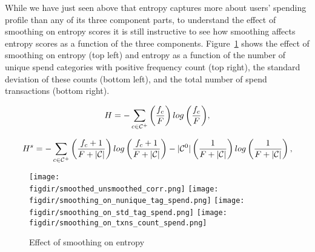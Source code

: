 While we have just seen above that entropy captures more about users' spending
profile than any of its three component parts, to understand the effect of
smoothing on entropy scores it is still instructive to see how smoothing
affects entropy scores as a function of the three components.
Figure~\ref{fig:effect_of_smoothing} shows the effect of smoothing on entropy
(top left) and entropy as a function of the number of unique spend categories
with positive frequency count (top right), the standard deviation of these
counts (bottom left), and the total number of spend transactions (bottom
right).




\newpage

\begin{equation}
\label{equ:entropy_us}
H = -\sum_{c \in \mathcal{C}^{+}}{\left(\frac{f_c}{F}\right)
log\left(\frac{f_c}{F}\right)},
\end{equation}

\begin{equation}
\label{equ:entropy_s}
H^s = -\sum_{c \in \mathcal{C}^{+}}{\left(\frac{f_c + 1}{F + |\mathcal{C}|}\right)
log\left(\frac{f_c + 1}{F + |\mathcal{C}|}\right)}
- |\mathcal{C}^{0}|\left(\frac{1}{F + |\mathcal{C}|}\right)
log\left(\frac{1}{F + |\mathcal{C}|}\right),
\end{equation}



\begin{figure}[h]
    \centering 
    \caption{Effect of smoothing on entropy}
    \label{fig:effect_of_smoothing}
    \texttt{[image: \\figdir/smoothed\_unsmoothed\_corr.png]}
    \texttt{[image: \\figdir/smoothing\_on\_nunique\_tag\_spend.png]}
    \texttt{[image: \\figdir/smoothing\_on\_std\_tag\_spend.png]}
    \texttt{[image: \\figdir/smoothing\_on\_txns\_count\_spend.png]}
\end{figure}


\newpage



